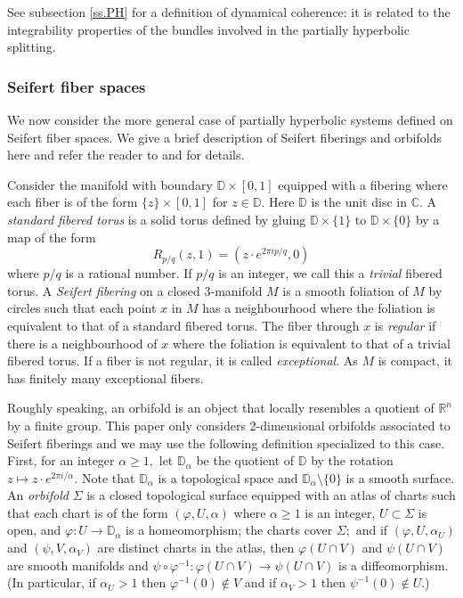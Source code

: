 \documentclass[11pt]{amsart} %
\newcommand{\bbC}{\mathbb{C}}
\newcommand{\bbD}{\mathbb{D}}
\newcommand{\bbR}{\mathbb{R}}
\newcommand{\inv}{^{-1}}
\newcommand{\sans}{\setminus}
\newcommand{\subof}{\subset}
\newcommand{\Sig}{\Sigma}
\newcommand{\al}{\alpha}
\numberwithin{equation}{section}
\theoremstyle{remark}
\begin{document}
See subsection \ref{ss.PH} for a definition of dynamical coherence: it is related to the integrability properties of the bundles involved in the partially hyperbolic splitting. 

\subsubsection{Seifert fiber spaces}

We now consider the more general case of partially hyperbolic systems defined
on Seifert fiber spaces.
We give a brief description of Seifert fiberings and orbifolds here
and refer the reader to 
\cite{sco1983geometries} and \cite{cho2012geometric}
for details.

Consider the manifold with boundary $\bbD \times [0,1]$
equipped with a fibering where
each fiber is of the form $\{z\} \times [0,1]$ for $z \in \bbD$.
Here $\bbD$ is the unit disc in $\bbC$.
A \emph{standard fibered torus} is a solid torus
defined by gluing $\bbD \times \{1\}$ to $\bbD \times \{0\}$
by a map of the form
\[
    R_{p/q}(z,1) = (z \cdot e^{2 \pi i p/q}, 0)
\]
where $p/q$ is a rational number.
If $p/q$ is an integer, we call this a
\emph{trivial} fibered torus.
A \emph{Seifert fibering} on a closed 3-manifold $M$
is a smooth foliation of $M$ by circles
such that each point $x$ in $M$ has a neighbourhood
where the foliation is equivalent to that
of a standard fibered torus.
The fiber through $x$ is \emph{regular} if there is a
neighbourhood of $x$ where the foliation is equivalent to that of
a trivial fibered torus.
If a fiber is not regular, it is called \emph{exceptional}.
As $M$ is compact,
it has finitely many exceptional fibers.

Roughly speaking,
an orbifold is an object that locally resembles
a quotient of $\bbR^n$ by a finite group.
This paper only considers 2-dimensional orbifolds
associated to Seifert fiberings
and we may use the following definition specialized to this case.
First, for an integer $\al \ge 1,$
let $\bbD_\al$ be the quotient of $\bbD$
by the rotation $z \mapsto z \cdot e^{2 \pi i/\al}.$
Note that $\bbD_\al$ is a topological space
and $\bbD_\al \sans \{0\}$ is a smooth surface.
An \emph{orbifold} $\Sig$ is a closed topological surface
equipped with an atlas of charts such that
each chart is of the form
$(\varphi, U, \al)$
where $\al \ge 1$ is an integer,
$U \subof \Sig$ is open, and
$\varphi : U \to \bbD_\al$ is a homeomorphism;
the charts cover $\Sig;$ and
if $(\varphi, U, \al_U)$ and $(\psi, V, \al_V)$
are distinct charts in the atlas,
then $\varphi(U \cap V)$ and $\psi(U \cap V)$
are smooth manifolds and
\begin{math}
    \psi \circ \varphi \inv : \varphi(U \cap V) \to \psi(U \cap V)
\end{math}
is a diffeomorphism.
(In particular,
if $\al_U > 1$ then $\varphi \inv(0) \notin V$ and
if $\al_V > 1$ then $\psi \inv(0) \notin U.$)
\end{document}
